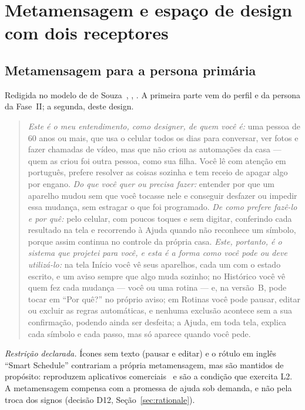 \documentclass[conference,onecolumn]{IEEEtran}
\begin{document}
\section{Metamensagem e espaço de design com dois receptores}\label{sec:meta}

\subsection{Metamensagem para a persona primária}
Redigida no modelo de de Souza~\cite{desouza2005}, \cite{barbosa2010}, \cite{aula14}. A primeira parte vem do perfil e da persona da Fase~II; a segunda, deste design.

\begin{quote}\small
\textit{Este é o meu entendimento, como designer, de quem você é:} uma pessoa de 60 anos ou mais, que usa o celular todos os dias para conversar, ver fotos e fazer chamadas de vídeo, mas que não criou as automações da casa --- quem as criou foi outra pessoa, como sua filha. Você lê com atenção em português, prefere resolver as coisas sozinha e tem receio de apagar algo por engano. \textit{Do que você quer ou precisa fazer:} entender por que um aparelho mudou sem que você tocasse nele e conseguir desfazer ou impedir essa mudança, sem estragar o que foi programado. \textit{De como prefere fazê-lo e por quê:} pelo celular, com poucos toques e sem digitar, conferindo cada resultado na tela e recorrendo à Ajuda quando não reconhece um símbolo, porque assim continua no controle da própria casa. \textit{Este, portanto, é o sistema que projetei para você, e esta é a forma como você pode ou deve utilizá-lo:} na tela Início você vê seus aparelhos, cada um com o estado escrito, e um aviso sempre que algo muda sozinho; no Histórico você vê quem fez cada mudança --- você ou uma rotina --- e, na versão~B, pode tocar em ``Por quê?'' no próprio aviso; em Rotinas você pode pausar, editar ou excluir as regras automáticas, e nenhuma exclusão acontece sem a sua confirmação, podendo ainda ser desfeita; a Ajuda, em toda tela, explica cada símbolo e cada passo, mas só aparece quando você pede.
\end{quote}

\textit{Restrição declarada.} Ícones sem texto (pausar e editar) e o rótulo em inglês ``Smart Schedule'' contrariam a própria metamensagem, mas são mantidos de propósito: reproduzem aplicativos comerciais~\cite[pp.~34--35]{tsuchiya2018} e são a condição que exercita L2. A metamensagem compensa com a promessa de ajuda sob demanda, e não pela troca dos signos (decisão D12, Seção~\ref{sec:rationale}).
\end{document}
